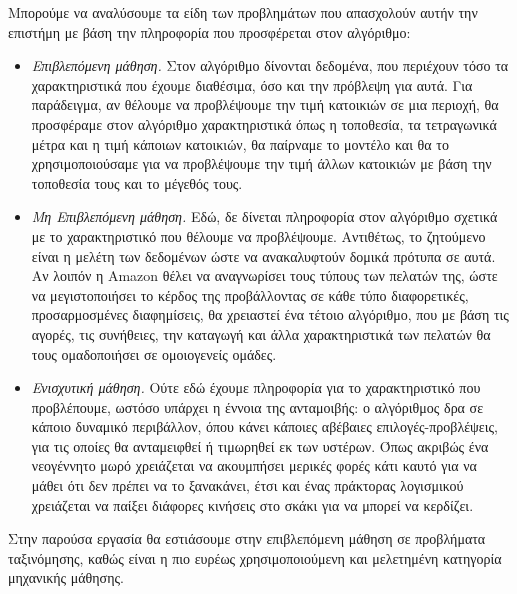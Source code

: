 \documentclass{article}
\begin{document}
Μπορούμε να αναλύσουμε τα είδη των προβλημάτων που απασχολούν αυτήν την επιστήμη με βάση την πληροφορία που προσφέρεται στον αλγόριθμο:
\begin{itemize}
\item \textit{Επιβλεπόμενη μάθηση.} Στον αλγόριθμο δίνονται δεδομένα, που περιέχουν τόσο τα χαρακτηριστικά που έχουμε διαθέσιμα, όσο και την πρόβλεψη για αυτά. Για παράδειγμα, αν θέλουμε να προβλέψουμε την τιμή κατοικιών σε μια περιοχή, θα προσφέραμε στον αλγόριθμο χαρακτηριστικά όπως η τοποθεσία, τα τετραγωνικά μέτρα και η τιμή κάποιων κατοικιών, θα παίρναμε το μοντέλο και θα το χρησιμοποιούσαμε για να προβλέψουμε την τιμή άλλων κατοικιών με βάση την τοποθεσία τους και το μέγεθός τους.
\item \textit{Μη Επιβλεπόμενη μάθηση.} Εδώ, δε δίνεται πληροφορία στον αλγόριθμο σχετικά με το χαρακτηριστικό που θέλουμε να προβλέψουμε. Αντιθέτως, το ζητούμενο είναι η μελέτη των δεδομένων ώστε να ανακαλυφτούν δομικά πρότυπα σε αυτά. Αν λοιπόν η Amazon θέλει να αναγνωρίσει τους τύπους των πελατών της, ώστε να μεγιστοποιήσει το κέρδος της προβάλλοντας σε κάθε τύπο διαφορετικές, προσαρμοσμένες διαφημίσεις, θα χρειαστεί ένα τέτοιο αλγόριθμο, που με βάση τις αγορές, τις συνήθειες, την καταγωγή και άλλα χαρακτηριστικά των πελατών θα τους
ομαδοποιήσει σε ομοιογενείς ομάδες.
\item \textit{Ενισχυτική μάθηση.} Ούτε εδώ έχουμε πληροφορία για το χαρακτηριστικό που προβλέπουμε, ωστόσο υπάρχει η έννοια της ανταμοιβής: ο αλγόριθμος δρα σε κάποιο δυναμικό περιβάλλον, όπου κάνει κάποιες αβέβαιες επιλογές-προβλέψεις, για τις οποίες θα ανταμειφθεί ή τιμωρηθεί εκ των υστέρων. Όπως ακριβώς ένα νεογέννητο μωρό χρειάζεται να ακουμπήσει μερικές φορές κάτι καυτό για να μάθει ότι δεν πρέπει να το ξανακάνει, έτσι και ένας πράκτορας λογισμικού χρειάζεται να παίξει διάφορες κινήσεις στο σκάκι για να μπορεί να κερδίζει.
\end{itemize}

Στην παρούσα εργασία θα εστιάσουμε στην επιβλεπόμενη μάθηση σε προβλήματα ταξινόμησης, καθώς είναι η πιο ευρέως χρησιμοποιούμενη και μελετημένη κατηγορία μηχανικής μάθησης.
\end{document}
